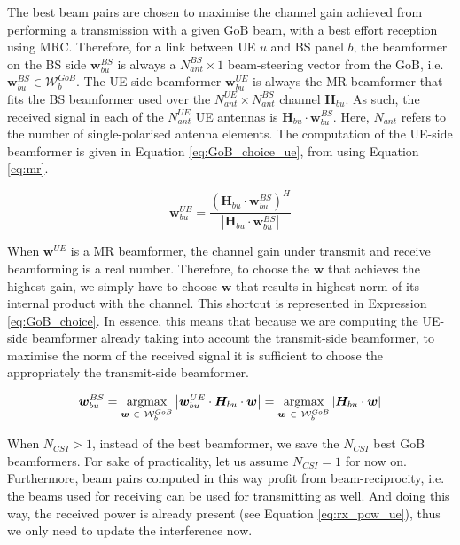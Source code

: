The best beam pairs are chosen to maximise the channel gain achieved from performing a transmission with a given GoB beam, with a best effort reception using \acs{MRC}. Therefore, for a link between UE $u$ and BS panel $b$, the beamformer on the BS side $\bm{w}^{BS}_{bu}$ is always a $N_{ant}^{BS}\times 1$ beam-steering vector from the GoB, i.e. $\bm{w}^{BS}_{bu} \in \mathcal{W}^{GoB}_b$. The UE-side beamformer $\bm{w}^{UE}_{bu}$ is always the \ac{MR} beamformer that fits the BS beamformer used over the $N_{ant}^{UE} \times N_{ant}^{BS}$ channel $\bm{H}_{bu}$. As such, the received signal in each of the $N_{ant}^{UE}$ UE antennas is $\bm{H}_{bu} \cdot \bm{w}^{BS}_{bu}$. Here, $N_{ant}$ refers to the number of single-polarised antenna elements. The computation of the UE-side beamformer is given in Equation \ref{eq:GoB_choice_ue}, from using Equation \ref{eq:mr}. 


\begin{equation} \label{eq:GoB_choice_ue}
    \bm{w}^{UE}_{bu} = \frac{\left(\bm{H}_{bu} \cdot \bm{w}^{BS}_{bu}\right)^H}{\left|\bm{H}_{bu} \cdot \bm{w}^{BS}_{bu}\right|}
\end{equation}


When $\bm{w}^{UE}$ is a MR beamformer, the channel gain under transmit and receive beamforming is a real number. Therefore, to choose the $\bm{w}$ that achieves the highest gain, we simply have to choose $\bm{w}$ that results in highest norm of its internal product with the channel. This shortcut is represented in Expression \eqref{eq:GoB_choice}. In essence, this means that because we are computing the UE-side beamformer already taking into account the transmit-side beamformer, to maximise the norm of the received signal it is sufficient to choose the appropriately the transmit-side beamformer. 

\begin{equation} \label{eq:GoB_choice}
    \bm{w}^{BS}_{bu} = \operatorname*{argmax}_{\bm{w} \ \in \ \mathcal{W}^{GoB}_b} \left| \bm{w}^{UE}_{bu} \cdot \bm{H}_{bu} \cdot \bm{w} \right| = \operatorname*{argmax}_{\bm{w} \ \in \ \mathcal{W}^{GoB}_b} \left| \bm{H}_{bu} \cdot \bm{w}\right|
\end{equation}

When $N_{CSI} > 1$, instead of the best beamformer, we save the $N_{CSI}$ best GoB beamformers. For sake of practicality, let us assume $N_{CSI} = 1$ for now on. Furthermore, beam pairs computed in this way profit from beam-reciprocity, i.e. the beams used for receiving can be used for transmitting as well. And doing this way, the received power is already present (see Equation \eqref{eq:rx_pow_ue}), thus we only need to update the interference now.

